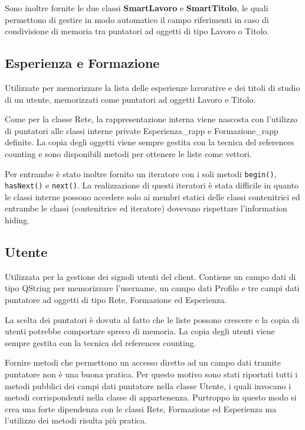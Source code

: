 \documentclass[a4paper,10pt]{article}
\begin{document}
Sono inoltre fornite le due classi \textbf{SmartLavoro} e \textbf{SmartTitolo}, le quali permettono di gestire in modo automatico il campo riferimenti in caso di condivisione di memoria tra puntatori ad oggetti di tipo Lavoro o Titolo.

\subsection*{Esperienza e Formazione}
Utilizzate per memorizzare la lista delle esperienze lavorative e dei titoli di studio di un utente, memorizzati come puntatori ad oggetti Lavoro e Titolo.

Come per la classe Rete, la rappresentazione interna viene nascosta con l'utilizzo di puntatori alle classi interne private Esperienza\_rapp e Formazione\_rapp definite. La copia degli oggetti viene sempre gestita con la tecnica del references counting e sono disponibili metodi per ottenere le liste come vettori.

Per entrambe è stato inoltre fornito un iteratore con i soli metodi \texttt{begin()}, \texttt{hasNext()} e \texttt{next()}. La realizzazione di questi iteratori è stata difficile in quanto le classi interne possono accedere solo ai membri statici delle classi contenitrici ed entrambe le classi (contenitrice ed iteratore) dovevano rispettare l'information hiding.

\subsection*{Utente}
Utilizzata per la gestione dei signoli utenti del client. Contiene un campo dati di tipo QString per memorizzare l'username, un campo dati Profilo e tre campi dati puntatore ad oggetti di tipo Rete, Formazione ed Esperienza. 

La scelta dei puntatori è dovuta al fatto che le liste possono crescere e la copia di utenti potrebbe comportare spreco di memoria. La copia degli utenti viene sempre gestita con la tecnica del references counting.

Fornire metodi che permettono un accesso diretto ad un campo dati tramite puntatore non è una buona pratica. Per questo motivo sono stati riportati tutti i metodi pubblici dei campi dati puntatore nella classe Utente, i quali invocano i metodi corrispondenti nella classe di appartenenza. Purtroppo in questo modo si crea una forte dipendenza con le classi Rete, Formazione ed Esperienza ma l'utilizzo dei metodi risulta più pratica.
\end{document}
